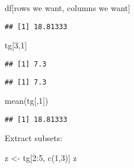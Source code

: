 \documentclass[
]{article}
\newenvironment{Shaded}{\begin{snugshade}}{\end{snugshade}}
\newcommand{\DecValTok}[1]{\textcolor[rgb]{0.00,0.00,0.81}{#1}}
\newcommand{\FunctionTok}[1]{\textcolor[rgb]{0.00,0.00,0.00}{#1}}
\newcommand{\NormalTok}[1]{#1}
\newcommand{\OtherTok}[1]{\textcolor[rgb]{0.56,0.35,0.01}{#1}}
\newcommand{\SpecialCharTok}[1]{\textcolor[rgb]{0.00,0.00,0.00}{#1}}
\begin{document}
df{[}rows we want, columns we want{]}

\begin{Shaded}
\end{Shaded}

\begin{verbatim}
## [1] 18.81333
\end{verbatim}

\begin{Shaded}
\begin{Highlighting}[]
\NormalTok{tg[}\DecValTok{3}\NormalTok{,}\DecValTok{1}\NormalTok{]}
\end{Highlighting}
\end{Shaded}

\begin{verbatim}
## [1] 7.3
\end{verbatim}

\begin{Shaded}
\end{Shaded}

\begin{verbatim}
## [1] 7.3
\end{verbatim}

\begin{Shaded}
\begin{Highlighting}[]
\FunctionTok{mean}\NormalTok{(tg[,}\DecValTok{1}\NormalTok{])}
\end{Highlighting}
\end{Shaded}

\begin{verbatim}
## [1] 18.81333
\end{verbatim}

Extract subsets:

\begin{Shaded}
\begin{Highlighting}[]
\NormalTok{z }\OtherTok{\textless{}{-}}\NormalTok{ tg[}\DecValTok{2}\SpecialCharTok{:}\DecValTok{5}\NormalTok{, }\FunctionTok{c}\NormalTok{(}\DecValTok{1}\NormalTok{,}\DecValTok{3}\NormalTok{)]}
\NormalTok{z}
\end{Highlighting}
\end{Shaded}
\end{document}
